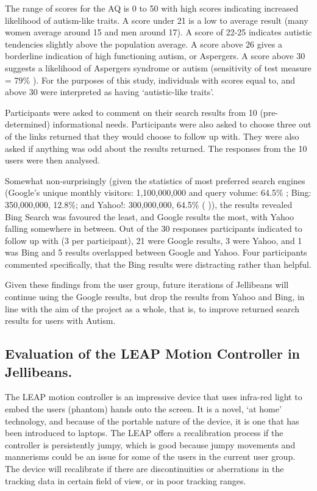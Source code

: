 \documentclass[a4paper, 11pt]{article}
\begin{document}
\vspace{5mm}
The range of scores for the AQ is 0 to 50 with high scores indicating increased likelihood of autism-like traits. A score under 21 is a low to average result (many women average around 15 and men around 17). A score of 22-25 indicates autistic tendencies slightly above the population average. A score above 26 gives a borderline indication of high functioning autism, or Aspergers. A score above 30 suggests a likelihood of Aspergers syndrome or autism (sensitivity of test measure = 79\% \cite{Baron Cohen et al}). For the purposes of this study, individuals with scores equal to, and above 30 were interpreted as having `autistic-like traits'.

\vspace{5mm}
Participants were asked to comment on their search results from 10 (pre-determined) informational needs. Participants were also asked to choose three out of the links returned that they would choose to follow up with. They were also asked if anything was odd about the results returned. The responses from the 10 users were then analysed. 

\vspace{5mm}
Somewhat non-surprisingly (given the statistics of most preferred search engines (Google's unique monthly visitors: 1,100,000,000 and query
volume: 64.5\% ; Bing: 350,000,000, 12.8\%; and Yahoo!: 300,000,000, 64.5\% (\cite{ebiz} \cite{adam})), the results revealed Bing Search was favoured the least, and Google results the most, with Yahoo falling somewhere in between. Out of the 30 responses participants indicated to follow up with (3 per participant), 21 were Google results, 3 were Yahoo, and 1 was Bing and 5 results overlapped between Google and Yahoo. Four participants commented specifically, that the Bing results were distracting rather than helpful.

\vspace{5mm}
Given these findings from the user group, future iterations of Jellibeans will continue using the Google results, but drop the results from Yahoo and Bing, in line with the aim of the project as a whole, that is, to improve returned search results for users with Autism.

\subsection {Evaluation of the LEAP Motion Controller in Jellibeans.}
The LEAP motion controller is an impressive device that uses infra-red light to embed the users (phantom) hands onto the screen. It is a novel, `at home' technology, and because of the portable nature of the device, it is one that has been introduced to laptops. The LEAP offers a recalibration process if the controller is persistently jumpy, which is good because jumpy movements and mannerisms could be an issue for some of the users in the current user group. The device will recalibrate if there are discontinuities or aberrations in the tracking data in certain field of view, or in poor tracking ranges. 
\end{document}
